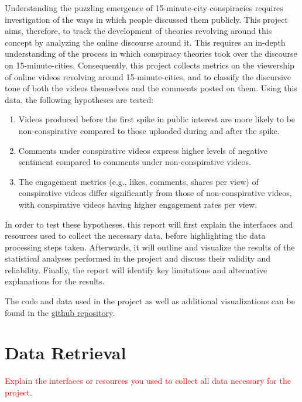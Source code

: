 \documentclass[fontsize=11pt, parskip=half]{scrartcl}
\begin{document}
    Understanding the puzzling emergence of 15-minute-city conspiracies requires investigation of the ways in which people discussed them publicly. This project aims, therefore, to track the development of theories revolving around this concept by analyzing the online discourse around it. This requires an in-depth understanding of the process in which conspiracy theories took over the discourse on 15-minute-cities. Consequently, this project collects metrics on the viewership of online videos revolving around 15-minute-cities, and to classify the discursive tone of both the videos themselves and the comments posted on them. Using this data, the following hypotheses are tested: 

    \begin{enumerate}
        \item Videos produced before the first spike in public interest are more likely to be non-conspirative compared to those uploaded during and after the spike. \label{h:1}
        \item Comments under conspirative videos express higher levels of negative sentiment compared to comments under non-conspirative videos. \label{h:2}
        \item The engagement metrics (e.g., likes, comments, shares per view) of conspirative videos differ significantly from those of non-conspirative videos, with conspirative videos having higher engagement rates per view. \label{h:3}
    \end{enumerate}

In order to test these hypotheses, this report will first explain the interfaces and resources used to collect the necessary data, before highlighting the data processing steps taken. Afterwards, it will outline and visualize the results of the statistical analyses performed in the project and discuss their validity and reliability. Finally, the report will identify key limitations and alternative explanations for the results.

The code and data used in the project as well as additional visualizations can be found in the \href{https://github.com/julia-king-edu/so-24_smda_project}{github repository}.
    
\section{Data Retrieval}
\label{section:retrieval}

    \textcolor{red}{Explain the interfaces or resources you used to collect all data necessary for the project.}
\end{document}
